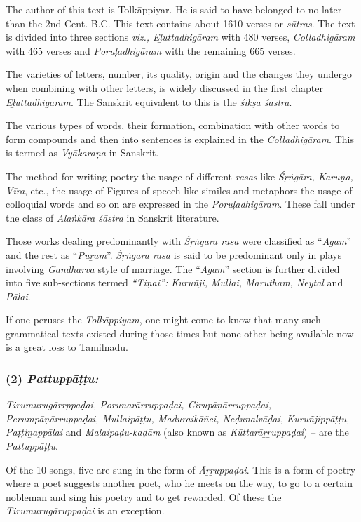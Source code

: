 The author of this text is Tolkāppiyar. He is said to have belonged to no later than the 2nd Cent. B.C. This text contains about 1610 verses or \textit{sūtras}. The text is divided into three sections \textit{viz., Eḻuttadhigāram} with 480 verses, \textit{Colladhigāram} with 465 verses and \textit{Poruḷadhigāram} with the remaining 665 verses.

The varieties of letters, number, its quality, origin and the changes they undergo when combining with other letters, is widely discussed in the first chapter \textit{Eḻuttadhigāram}. The Sanskrit equivalent to this is the \textit{śikṣā śāstra}.

The various types of words, their formation, combination with other words to form compounds and then into sentences is explained in the \textit{Colladhigāram}. This is termed as \textit{Vyākaraṇa} in Sanskrit.

The method for writing poetry the usage of different \textit{rasas} like \textit{Śṛṅgāra, Karuṇa, Vīra}, etc., the usage of Figures of speech like similes and metaphors the usage of colloquial words and so on are expressed in the \textit{Poruḷadhigāram}. These fall under the class of \textit{Alaṅkāra śāstra} in Sanskrit literature.

Those works dealing predominantly with \textit{Śṛṅgāra rasa} were classified as “\textit{Agam}” and the rest as “\textit{Puṟam}”. \textit{Śṛṅgāra rasa} is said to be predominant only in plays involving \textit{Gāndharva} style of marriage. The “\textit{Agam}” section is further divided into five sub-sections termed \textit{“Tiṇai”: Kuruñji, Mullai, Marutham, Neytal} and \textit{ Pālai}.

If one peruses the \textit{Tolkāppiyam}, one might come to know that many such grammatical texts existed during those times but none other being available now is a great loss to Tamilnadu.


\subsubsection*{(2) \textit{Pattuppāṭṭu:}}

\vskip -7pt

\textit{Tirumurugāṟṟppaḍai, Porunarāṟṟuppaḍai, Ciṟupāṇāṟṟuppaḍai, Perumpāṇā\-ṟṟuppaḍai, Mullaipāṭṭu, Maduraikāñci, Neḍunalvāḍai, Kuruñjippāṭṭu, Paṭṭi\-ṉappālai} and \textit{Malaipaḍu-kaḍām} (also known as \textit{Kūttarāṟṟuppaḍai}) – are the \textit{Pattuppāṭṭu}.

Of the 10 songs, five are sung in the form of \textit{Āṟṟuppaḍai}. This is a form of poetry where a poet suggests another poet, who he meets on the way, to go to a certain nobleman and sing his poetry and to get rewarded. Of these the \textit{Tirumurugāṟuppaḍai} is an exception.

